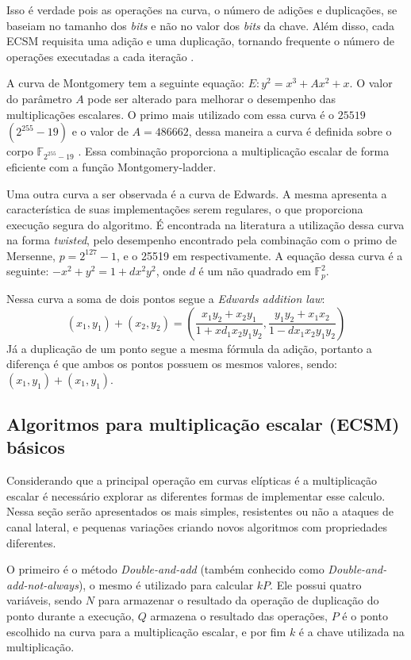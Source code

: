 Isso é verdade pois as operações na curva, o número de adições e duplicações, se baseiam no tamanho dos \textit{bits} e não no valor dos \textit{bits} da chave. Além disso, cada ECSM requisita uma adição e uma duplicação, tornando frequente o número de operações executadas a cada iteração \cite{Okeya2000}.

A curva de Montgomery tem a seguinte equação: $E: y^2 = x^3 + Ax^2 + x$. O valor do parâmetro $A$ pode ser alterado para melhorar o desempenho das multiplicações escalares. O primo mais utilizado com essa curva é o $25519$ $(2^{255}-19)$ e o valor de $A = 486662$, dessa maneira a curva é definida sobre o corpo $\mathbb{F}_{2^{255}-19}$ \cite{Dull:2015:HCM:2834659.2834708}. Essa combinação proporciona a multiplicação escalar de forma eficiente com a função Montgomery-ladder.

Uma outra curva a ser observada é a curva de Edwards. A mesma apresenta a característica de suas implementações serem regulares, o que proporciona execução segura do algoritmo. É encontrada na literatura a utilização dessa curva na forma \textit{twisted}, pelo desempenho encontrado pela combinação com o primo de Mersenne, $p = 2^{127} - 1$, e o 25519 em \cite{longa:2015, Bernstein2012} respectivamente. A equação dessa curva é a seguinte: $-x^2 + y^2 = 1 + dx^2y^2$, onde $d$ é um não quadrado em $\mathbb{F}_p^2$.

Nessa curva a soma de dois pontos segue a \textit{Edwards addition law}:
$$ (x_1,y_1) + (x_2,y_2) = (\frac{x_1y_2 + x_2y_1}{1 + xd_1x_2y_1y_2},\frac{y_1y_2 + x_1x_2}{1 - dx_1x_2y_1y_2}) $$
Já a duplicação de um ponto segue a mesma fórmula da adição, portanto a diferença é que ambos os pontos possuem os mesmos valores, sendo: $(x_1, y_1) + (x_1, y_1)$.

\subsection{Algoritmos para multiplicação escalar (ECSM) básicos}
Considerando que a principal operação em curvas elípticas é a multiplicação escalar é necessário explorar as diferentes formas de implementar esse calculo. Nessa seção serão apresentados os mais simples, resistentes ou não a ataques de canal lateral, e pequenas variações criando novos algoritmos com propriedades diferentes.

O primeiro é o método \textit{Double-and-add} (também conhecido como \textit{Double-and-add-not-always}), o mesmo é utilizado para calcular $kP$. Ele possui quatro variáveis, sendo $N$ para armazenar o resultado da operação de duplicação do ponto durante a execução, $Q$ armazena o resultado das operações, $P$ é o ponto escolhido na curva para a multiplicação escalar, e por fim $k$ é a chave utilizada na multiplicação.

